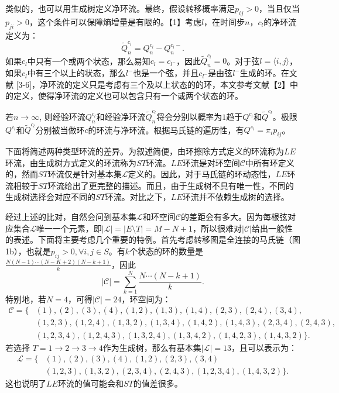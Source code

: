 类似的，也可以用生成树定义净环流。最终，假设转移概率满足$p_{ij}>0$，当且仅当$p_{ji}>0$，这个条件可以保障熵增量是有限的。【1】考虑$l
$，在时间步$n$，$c_l$的净环流定义为：
\begin{equation*}
    \tilde{Q}^{c_l}_n=Q^{c_l}_n-Q^{c_l-}_n.
\end{equation*}
如果$c_l$中只有一个或两个状态，那么易知$c_l = c_{l^-}$，因此$\tilde{Q}_n^{c_l}=0$。对于弦$l=\langle i,j \rangle$，如果$c_l$中有三个以上的状态，那么$l^-$也是一个弦，并且$c_{l^-}$是由弦$l^-$生成的环。在文献 [3-6]，净环流的定义只是考虑有三个及以上状态的的环，本文参考文献【2】中的定义，使得净环流的定义也可以包含只有一个或两个状态的环。

若$n \to \infty$, 则经验环流$Q_n^{c_l}$和经验净环流$\tilde{Q}_n^{c_l}$将会分别以概率为$1$趋于$Q^{c_l}$和$\tilde{Q}^{c_l}$。极限$Q^{c_l}$和$\tilde{Q}^{c_l}$分别被当做环$c$的环流与净环流。根据马氏链的遍历性，有$Q^{c_l} = \pi_i p_{ij}$。

下面将简述两种类型环流的差异。为叙述简便，由环擦除方式定义的环流称为$LE$环流，由生成树方式定义的环流称为$ST$环流。$LE$环流是对环空间$\mathcal{C}$中所有环定义的，然而$ST$环流仅是针对基本集$\mathcal{L}$定义的。因此，对于马氏链的环动态性，$LE$环流相较于$ST$环流给出了更完整的描述。而且，由于生成树不具有唯一性，不同的生成树选择会对应不同的$ST$环流。对比之下，$LE$环流并不依赖生成树的选择。

经过上述的比对，自然会问到基本集$\mathcal{L}$和环空间$\mathcal{C}$的差距会有多大。因为每根弦对应集合$\mathcal{L}$唯一一个元素，即$|\mathcal{L}| = |E\setminus T| = M-N+1$，所以很难对$|\mathcal{C}|$给出一般性的表述。下面将主要考虑几个重要的特例。首先考虑转移图是全连接的马氏链（图1b），也就是$p_{ij}>0, \forall i,j \in S$。有$k$个状态的环的数量是$\frac{N (N-1) \cdots (N-K+2)(N-k+1)}{k}$，因此
\begin{equation*}
    |\mathcal{C}| = \sum_{k=1}^N\frac{N\cdots (N-k+1)}{k}.
\end{equation*}
特别地，若$N=4$，可得$|\mathcal{C}|=24$，环空间为：
\begin{align*}
    \mathcal{C} = \{&(1),(2),(3),(4),(1,2),(1,3),(1,4),(2,3),(2,4),(3,4),\\
    &(1,2,3),(1,2,4),(1,3,2),(1,3,4),(1,4,2),(1,4,3),(2,3,4),(2,4,3),\\
    &(1,2,3,4),(1,2,4,3),(1,3,2,4),(1,3,4,2),(1,4,2,3),(1,4,3,2)\}.
\end{align*}
若选择 $T = 1\to 2\to 3\to 4$作为生成树，那么有基本集$|\mathcal{L}|=13$，且可以表示为：
\begin{align*}
    \mathcal{L} = \{&(1),(2),(3),(4),(1,2),(2,3),(3,4)\\
    &(1,2,3),(1,3,2),(2,3,4),(2,4,3),(1,2,3,4),(1,4,3,2)\}.
\end{align*}
这也说明了$LE$环流的值可能会和$ST$的值差很多。

